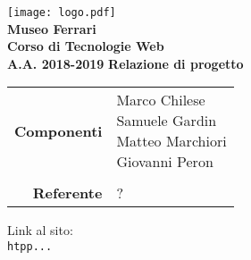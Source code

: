 


\begin{titlepage}
\thispagestyle{empty}

\begin{center}

\texttt{[image: logo.pdf]}\\ 
\large \textbf{Museo Ferrari\\ \small Corso di Tecnologie Web\\ A.A. 2018-2019}
\vfill
\Huge \textbf{Relazione di progetto}
\vfill
\large
\renewcommand{\arraystretch}{1.3}
\begin{tabular}{r|l}
\textbf{Componenti} & \parbox[t]{5cm}{Marco Chilese\\Samuele Gardin\\Matteo Marchiori\\Giovanni Peron}\\
\-\\
\textbf{Referente} & \parbox[t]{5cm}{?}\\
\end{tabular}
\vfill
\small
Link al sito:\\
\texttt{htpp...}
\end{center}
\end{titlepage}

\pagebreak

\tableofcontents

\pagebreak




\pagebreak



\pagebreak



\pagebreak



\pagebreak





\pagebreak




